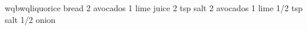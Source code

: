 wqbwqliquorice
bread
2 avocados 
1 lime juice
2 tsp salt
2 avocados 
1 lime
1/2 tsp salt
1/2 onion

